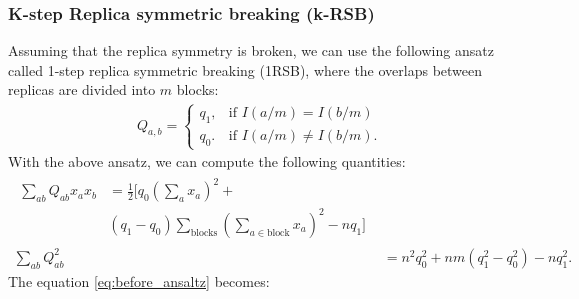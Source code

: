 \documentclass[aps,physrev,10pt,floatfix,longbibliography,nofootinbib,reprint]{revtex4-2}
\begin{document}
\subsubsection{K-step Replica symmetric breaking (k-RSB)}
Assuming that the replica symmetry is broken, we can use the following ansatz called 1-step replica symmetric breaking (1RSB), where the overlaps between replicas are divided into $m$ blocks:
\begin{eqnarray}
    Q_{a,b}=\begin{cases}
			q_1, & \text{if } I(a/m)=I(b/m) \\
            q_0. & \text{if } I(a/m) \neq I(b/m).
		 \end{cases}
\end{eqnarray}
With the above ansatz, we can compute the following quantities:
\begin{align}
\begin{split}
    \sum_{ab} Q_{ab} x_{a} x_{b}  &  = \frac{1}{2} \bigg[ q_0 \left( \sum_{a}x_a\right)^2 +\\ 
& (q_1-q_0) \sum_{\text{blocks}}  \left( \sum_{a \in \text{block}}x_a\right)^2   - nq_1\bigg] 
\end{split}
\\
\sum_{ab} Q_{ab}^2 & =  n^2 q_0^2 + nm(q_1^2 - q_0^2) -n q_1^2.
\end{align}
The equation \ref{eq:before_ansaltz} becomes:
\end{document}
